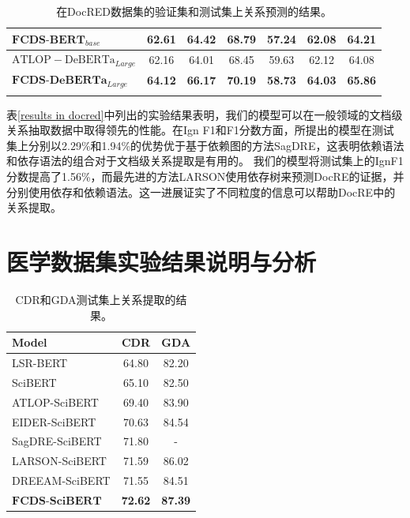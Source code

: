 \documentclass[bachelor]{thesis-uestc}
\begin{document}
\begin{table}
\begin{tabular}{@{}llllcccccc@{}}
    \multicolumn{4}{l}{$\mathrm{\textbf{FCDS-BERT}}_{base}$}              & \textbf{62.61} & \textbf{64.42} & \textbf{68.79}    & \textbf{57.24}    & \textbf{62.08}       & \textbf{64.21}      \\ \midrule
    \multicolumn{4}{l}{$\mathrm{ATLOP-DeBERTa}_{Large}$\cite{zhou2021document}}          & 62.16 & 64.01 & 68.45        & 59.63        & 62.12       & 64.08      \\
    \multicolumn{4}{l}{$\mathrm{\textbf{FCDS-DeBERTa}}_{Large}$}           & \textbf{64.12} & \textbf{66.17} & \textbf{70.19}        & \textbf{58.73}        & \textbf{64.03}       & \textbf{65.86}    \\ \midrule \\
    \end{tabular}
    \caption{在DocRED数据集的验证集和测试集上关系预测的结果。}
\end{table}\label{results in docred}

表\ref{results in docred}中列出的实验结果表明，我们的模型可以在一般领域的文档级关系抽取数据中取得领先的性能。在Ign F1和F1分数方面，所提出的模型在测试集上分别以2.29\%和1.94\%的优势优于基于依赖图的方法SagDRE\cite{SagDRE}，这表明依赖语法和依存语法的组合对于文档级关系提取是有用的。
我们的模型将测试集上的IgnF1分数提高了1.56\%，而最先进的方法LARSON\cite{duan-etal-2022-just}使用依存树来预测DocRE的证据，并分别使用依存和依赖语法。这一进展证实了不同粒度的信息可以帮助DocRE中的关系提取。\par

\section{医学数据集实验结果说明与分析}\label{sec:medical}

\begin{table}[]
    \centering 
    \begin{tabular}{lcc}
    \hline
    Model          & CDR            & GDA            \\ \hline
    LSR-BERT\cite{nan-etal-2020-reasoning}       & 64.80           & 82.20           \\
    SciBERT\cite{zhou2021document}        & 65.10           & 82.50           \\
    ATLOP-SciBERT\cite{zhou2021document}  & 69.40           & 83.90           \\
    EIDER-SciBERT\cite{xie2022eider}  & 70.63          & 84.54          \\
    SagDRE-SciBERT\cite{SagDRE} & 71.80          & -              \\ 
    LARSON-SciBERT\cite{duan-etal-2022-just} & 71.59          & 86.02              \\ 
    DREEAM-SciBERT\cite{ma-etal-2023-DREEAM} & 71.55          & 84.51              \\ 
    $\mathrm{\textbf{FCDS-SciBERT}}$           & \textbf{72.62} & \textbf{87.39} \\ \hline
    \end{tabular}
    \caption{CDR和GDA测试集上关系提取的结果。}
\end{table}\label{CDR/GDA}
\end{document}
